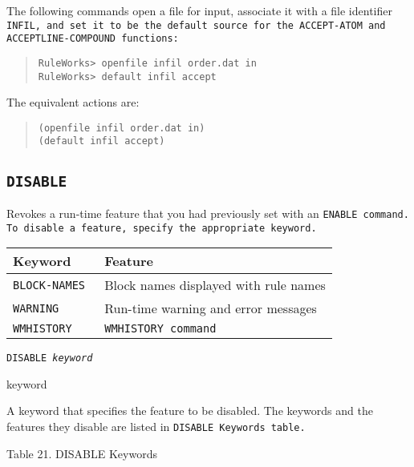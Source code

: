 \Example

The following commands open a file for input, associate it with a file
identifier \tt{INFIL}, and set it to be the default source for the
\tt{ACCEPT-ATOM} and \tt{ACCEPTLINE-COMPOUND} functions:

\begin{quote}
\begin{verbatim}
RuleWorks> openfile infil order.dat in
RuleWorks> default infil accept
\end{verbatim}
\end{quote}

The equivalent actions are:

\begin{quote}
\begin{verbatim}
(openfile infil order.dat in)
(default infil accept)
\end{verbatim}
\end{quote}

\subsection{\tt{DISABLE}}

Revokes a run-time feature that you had previously set with an
\tt{ENABLE} command. To disable a feature, specify the appropriate
keyword.

\begin{center}
\begin{tabular}{ll}
  \toprule
  Keyword     & Feature \\
  \midrule
  \tt{BLOCK-NAMES} & Block names displayed with rule names \\
  \tt{WARNING}     & Run-time warning and error messages   \\
  \tt{WMHISTORY}   & \tt{WMHISTORY} command \\
  \bottomrule
\end{tabular}
\end{center}

\Format

\tt{DISABLE} \it{keyword}

\begin{arguments}
\item[keyword]

  A keyword that specifies the feature to be disabled. The keywords
  and the features they disable are listed in \tt{DISABLE} Keywords
  table.
\end{arguments}

Table 21. DISABLE Keywords

